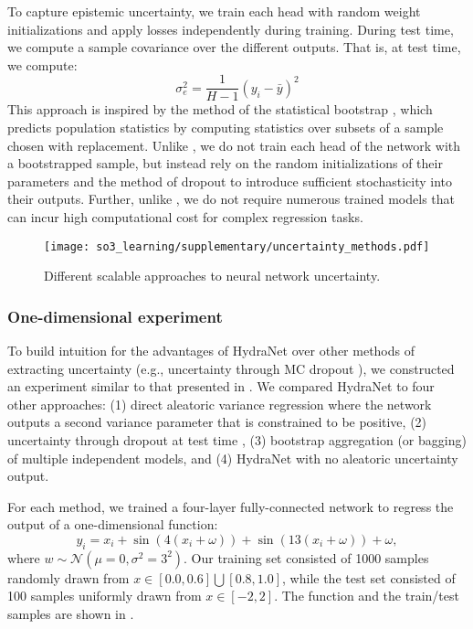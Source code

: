 To capture epistemic uncertainty, we train each head with random weight initializations and apply losses independently during training. During test time, we compute a sample covariance over the different outputs. That is, at test time, we compute:
\begin{equation}
\sigma_e^2 = \frac{1}{H-1} (y_i - \bar{y})^2	
\end{equation}
 This approach is inspired by the method of the statistical bootstrap \citep{Osband2016}, which predicts population statistics by computing statistics over subsets of a sample chosen with replacement. Unlike \cite{Osband2016}, we do not train each head of the network with a bootstrapped sample, but instead rely on the random initializations of their parameters and the method of dropout to introduce sufficient stochasticity into their outputs. Further, unlike \cite{Lakshminarayanan2017}, we do not require numerous trained models that can incur high computational cost for complex regression tasks.


\begin{figure*}
	\centering
	\texttt{[image: so3\_learning/supplementary/uncertainty\_methods.pdf]}
	\caption{Different scalable approaches to neural network uncertainty. }
	\label{fig:nn-uncertainty}
\end{figure*}

\subsubsection{One-dimensional experiment}

To build intuition for the advantages of HydraNet over other methods of extracting uncertainty (e.g., uncertainty through MC dropout \citep{Gal2016-ny}), we constructed an experiment similar to that presented in \citep{Osband2016}. We compared HydraNet to four other approaches: (1) direct aleatoric variance regression where the network outputs a second variance parameter that is constrained to be positive, (2) uncertainty through dropout at test time \citep{Gal2016-ny}, (3) bootstrap aggregation (or bagging) of multiple independent models, and (4) HydraNet with no aleatoric uncertainty output.  

For each method, we trained a four-layer fully-connected network to regress the output of a one-dimensional function: 
\begin{equation}
y_i = x_i + \sin{\left(4( x_i + \omega)\right)} + \sin{\left(13(x_i + \omega)\right)} + \omega,
\end{equation}
where $w \sim \mathcal{N}(\mu=0, \sigma^2=3^2)$. Our training set consisted of 1000 samples randomly drawn from $x \in \left[0.0,0.6\right]\bigcup \left[0.8,1.0\right]$, while the test set consisted of 100 samples uniformly drawn from $x \in \left[ -2, 2\right]$. The function and the train/test samples are shown in . 

